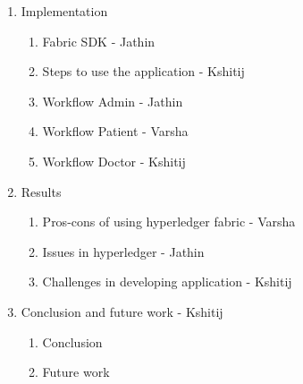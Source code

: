 \begin{enumerate}
\begin{enumerate} [label=3.\arabic*]
            - Data re-encryption - Kshitij
    \end{enumerate} 
    \item Implementation 
    \begin{enumerate} [label=4.\arabic*]
        \item Fabric SDK - Jathin
        \item Steps to use the application - Kshitij
        \item Workflow Admin - Jathin
        \item Workflow Patient - Varsha
        \item Workflow Doctor - Kshitij
    \end{enumerate}
    \item Results
    \begin{enumerate} [label=5.\arabic*]
        \item Pros-cons of using hyperledger fabric - Varsha
        \item Issues in hyperledger - Jathin
        \item Challenges in developing application - Kshitij
    \end{enumerate}
    \item Conclusion and future work - Kshitij
    \begin{enumerate} [label=6.\arabic*]
        \item Conclusion
        \item Future work
    \end{enumerate}
\end{enumerate}
 
 